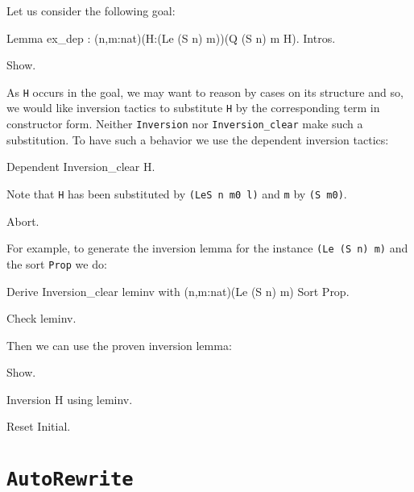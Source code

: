 \begin{coq_example*}
Let us consider the following goal:

\begin{coq_eval}
Lemma ex_dep : (n,m:nat)(H:(Le (S n) m))(Q (S n) m H).
Intros.
\end{coq_eval}

\begin{coq_example}
Show.
\end{coq_example}

As \texttt{H} occurs in the goal, we may want to reason by cases on its
structure and so, we would like  inversion tactics to
substitute \texttt{H} by the corresponding term in constructor form. 
Neither \texttt{Inversion} nor  {\tt Inversion\_clear} make such a
substitution. 
To have such a behavior we use the dependent inversion tactics:

\begin{coq_example}
Dependent Inversion_clear H.
\end{coq_example}

Note that \texttt{H} has been substituted by \texttt{(LeS n m0 l)} and
\texttt{m} by \texttt{(S m0)}.


\begin{coq_eval}
Abort.
\end{coq_eval}

For example, to generate the inversion lemma for the instance
\texttt{(Le (S n) m)} and the sort \texttt{Prop} we do:

\begin{coq_example*}
Derive Inversion_clear leminv with (n,m:nat)(Le (S n) m) Sort Prop.
\end{coq_example*}

\begin{coq_example}
Check leminv.
\end{coq_example}

Then we can use the proven inversion lemma:

\begin{coq_example}
Show.
\end{coq_example}

\begin{coq_example}
Inversion H using leminv.
\end{coq_example}

\begin{coq_eval}
Reset Initial.
\end{coq_eval}

\section{\tt AutoRewrite}
\label{AutoRewrite-example}


\end{coq_example*}
